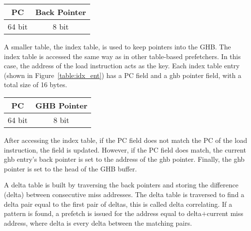 \begin{center}
  \begin{tabular}{| c | c |}
    \hline
    PC & Back Pointer \\ \hline
    64 bit & 8 bit \\ \hline
  \end{tabular}
  \label{table:ghb_ent}
\end{center}

A smaller table, the index table, is used to keep pointers into the
GHB. The index table is accessed the same way as in other table-based
prefetchers. In this case, the address of the load instruction acts as
the key. Each index table entry (shown in Figure~\ref{table:idx_ent})
has a PC field and a ghb pointer field, with a total size of 16 bytes.

\begin{center}
  \begin{tabular}{| c | c |}
    \hline
    PC & GHB Pointer \\ \hline
    64 bit & 8 bit \\ \hline
  \end{tabular}
  \label{table:idx_ent}
\end{center}

After accessing the index table, if the PC field does not match the PC
of the load instruction, the field is updated. However, if the PC
field does match, the current ghb entry's back pointer is set to the
address of the ghb pointer. Finally, the ghb pointer is set to the
head of the GHB buffer.

A delta table is built by traversing the back pointers and storing the
difference (delta) between consecutive miss addresses. The delta table
is traversed to find a delta pair equal to the first pair of deltas,
this is called delta correlating. If a pattern is found, a prefetch is
issued for the address equal to delta$+$current miss address, where
delta is every delta between the matching pairs.
